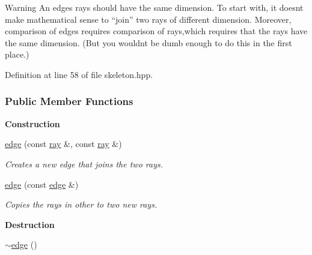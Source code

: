 \begin{DoxyWarning}{Warning}
An edge\textquotesingle{}s rays should have the same dimension. To start with, it doesn\textquotesingle{}t make mathematical sense to ``join'' two rays of different dimension. Moreover, comparison of edges requires comparison of rays,which requires that the rays have the same dimension. (But you wouldn\textquotesingle{}t be dumb enough to do this in the first place.) 
\end{DoxyWarning}


Definition at line 58 of file skeleton.\+hpp.

\subsubsection*{Public Member Functions}
\begin{Indent}\textbf{ Construction}\par
\begin{DoxyCompactItemize}
\item 
\mbox{\label{group___c_l_s_solvers_a80e74eefbaf1864ae1297fe2cea223ad}} 
\hyperlink{group___c_l_s_solvers_a80e74eefbaf1864ae1297fe2cea223ad}{edge} (const \hyperlink{group___c_l_s_solvers_classray}{ray} \&, const \hyperlink{group___c_l_s_solvers_classray}{ray} \&)
\begin{DoxyCompactList}\small\item\em Creates a new edge that joins the two rays. \end{DoxyCompactList}\item 
\mbox{\label{group___c_l_s_solvers_a93cf571922e2c7609ddeccaa24df1b59}} 
\hyperlink{group___c_l_s_solvers_a93cf571922e2c7609ddeccaa24df1b59}{edge} (const \hyperlink{group___c_l_s_solvers_classedge}{edge} \&)
\begin{DoxyCompactList}\small\item\em Copies the rays in {\ttfamily other} to two new rays. \end{DoxyCompactList}\end{DoxyCompactItemize}
\end{Indent}
\begin{Indent}\textbf{ Destruction}\par
\begin{DoxyCompactItemize}
\item 
\hyperlink{group___c_l_s_solvers_a6295b7f8e62fa95cd887fb78d64347f5}{$\sim$edge} ()
\end{DoxyCompactItemize}
\end{Indent}
